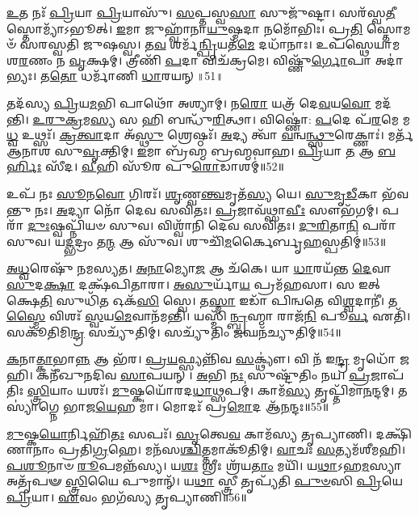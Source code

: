 \-\ul{𑌉}\-𑌤 𑌨𑌃᳴ \ul{𑌪𑍍𑌰𑌿}\-𑌯𑌾 \ul{𑌪𑍍𑌰𑌿}\-𑌯𑌾𑌸𑍁᳴।
\-\ul{𑌸}\-𑌪𑍍𑌤𑌸𑍍𑌵\-\ul{𑌸𑌾} 𑌸𑍁𑌜𑍁᳴𑌷𑍍𑌟𑌾।
𑌸𑌰᳴𑌸𑍍𑌵\-\ul{𑌤𑍀} 𑌸𑍍𑌤𑍋𑌮𑍍𑌯𑌾᳴\-𑌽𑌭𑍂𑌤𑍍।
\-\ul{𑌇}\-𑌮𑌾 𑌜𑍁𑌹𑍍𑌵𑌾᳴𑌨𑌾\-\ul{𑌯𑍁}\-𑌷𑍍𑌮𑌦𑌾 𑌨𑌮𑍋᳴𑌭𑌿𑌃।
𑌪𑍍𑌰\-\ul{𑌤𑌿} 𑌸𑍍𑌤𑍋𑌮𑍞᳴ 𑌸𑌰𑌸𑍍𑌵𑌤𑌿 𑌜𑍁𑌷𑌸𑍍𑌵।
𑌤\-\ul{𑌵} 𑌶𑌰𑍍𑌮᳴\-\ul{𑌨𑍍𑌪𑍍𑌰𑌿}\-𑌯𑌤᳴\-\ul{𑌮𑍇} 𑌦𑌧𑌾᳴𑌨𑌾𑌃।
𑌉𑌪᳴𑌸𑍍𑌥𑍇𑌯𑌾𑌮 𑌶\-\ul{𑌰}\-𑌣𑌂 𑌨 \ul{𑌵𑍃}\-𑌕𑍍𑌷𑌮𑍍।
𑌤𑍍𑌰𑍀𑌣𑌿᳴ \ul{𑌪}\-𑌦𑌾 𑌵𑌿𑌚᳴𑌕𑍍𑌰𑌮𑍇।
𑌵𑌿𑌷𑍍𑌣𑍁᳴\-\ul{𑌰𑍍𑌗𑍋}\-𑌪𑌾 𑌅𑌦𑌾॑𑌭𑍍𑌯𑌃।
𑌤\-\ul{𑌤𑍋} 𑌧𑌰𑍍𑌮𑌾᳴𑌣𑌿 \ul{𑌧𑌾}\-𑌰𑌯𑌨𑍍॥51॥

𑌤𑌦᳴𑌸𑍍𑌯 \ul{𑌪𑍍𑌰𑌿}\-𑌯\-\ul{𑌮}\-𑌭𑌿 𑌪𑌾𑌥𑍋᳴ 𑌅𑌶𑍍𑌯𑌾𑌮𑍍।
𑌨\-\ul{𑌰𑍋} 𑌯𑌤𑍍𑌰᳴ 𑌦𑍇\-\ul{𑌵}\-𑌯\-\ul{𑌵𑍋} 𑌮𑌦᳴𑌨𑍍𑌤𑌿।
\-\ul{𑌉}\-\-\ul{𑌰𑍁}\-\-\ul{𑌕𑍍𑌰}\-𑌮\-\ul{𑌸𑍍𑌯} 𑌸 𑌹𑌿 𑌬𑌨𑍍𑌧𑍁᳴\-\ul{𑌰𑌿}\-𑌤𑍍𑌥𑌾।
𑌵𑌿𑌷𑍍𑌣𑍋॑: \ul{𑌪}\-𑌦𑍇 𑌪᳴\-\ul{𑌰}\-𑌮𑍇 𑌮\-\ul{𑌧𑍍𑌵} 𑌉𑌥𑍍𑌸𑌃᳴।
\-\ul{𑌕𑍍𑌰}\-\-\ul{𑌤𑍍𑌵𑌾}\-𑌦𑌾 𑌅᳴\-\ul{𑌸𑍍𑌥𑍁} 𑌶𑍍𑌰𑍇𑌷𑍍𑌠𑌃᳴।
\-\ul{𑌅}\-𑌦𑍍𑌯 𑌤𑍍𑌵𑌾᳴ \ul{𑌵}\-𑌨𑍍𑌵\-\ul{𑌨𑍍𑌥𑍍𑌸𑍁}\-𑌰𑍇𑌕𑍍𑌣𑌾𑌃॑।
𑌮𑌰𑍍𑌤᳴ 𑌆𑌨𑌾𑌶 𑌸𑍁\-\ul{𑌵𑍃}\-𑌕𑍍𑌤𑌿𑌮𑍍।
\-\ul{𑌇}\-𑌮𑌾 𑌬𑍍𑌰᳴𑌹𑍍𑌮 𑌬𑍍𑌰𑌹𑍍𑌮𑌵𑌾𑌹।
\-\ul{𑌪𑍍𑌰𑌿}\-𑌯𑌾 \ul{𑌤} 𑌆 \ul{𑌬}\-\-\ul{𑌰𑍍}\-𑌹𑌿𑌃 𑌸𑍀᳴𑌦।
\-\ul{𑌵𑍀}\-𑌹𑌿 𑌸𑍂᳴𑌰 𑌪𑍁\-\ul{𑌰𑍋}\-𑌡𑌾𑌶𑌮𑍍॑॥52॥

𑌉𑌪᳴ 𑌨𑌃 \ul{𑌸𑍂}\-𑌨\-\ul{𑌵𑍋} 𑌗𑌿𑌰𑌃᳴।
\-\ul{𑌶𑍃}\-𑌣𑍍𑌵\-\ul{𑌨𑍍𑌤𑍍𑌵}\-𑌮𑍃𑌤᳴\-\ul{𑌸𑍍𑌯} 𑌯𑍇।
\-\ul{𑌸𑍁}\-\-\ul{𑌮𑍃}\-\-\ul{𑌡𑍀}\-𑌕𑌾 𑌭᳴𑌵𑌨𑍍𑌤𑍁 𑌨𑌃।
\-\ul{𑌅}\-𑌦𑍍𑌯𑌾 𑌨𑍋᳴ 𑌦𑍇𑌵 𑌸𑌵𑌿𑌤𑌃।
\-\ul{𑌪𑍍𑌰}\-𑌜𑌾𑌵᳴𑌥𑍍𑌸𑌾\-\ul{𑌵𑍀𑌃} 𑌸𑍗𑌭᳴𑌗𑌮𑍍।
𑌪𑌰𑌾᳴ \ul{𑌦𑍁𑌃}\-𑌷𑍍𑌵𑌪𑍍𑌨𑌿᳴𑌯𑍞 𑌸𑍁𑌵।
𑌵𑌿𑌶𑍍𑌵𑌾᳴𑌨𑌿 𑌦𑍇𑌵 𑌸𑌵𑌿𑌤𑌃।
\-\ul{𑌦𑍁}\-\-\ul{𑌰𑌿}\-𑌤𑌾\-\ul{𑌨𑌿} 𑌪𑌰𑌾᳴ 𑌸𑍁𑌵।
𑌯\-\ul{𑌦𑍍𑌭}\-𑌦𑍍𑌰𑌂 𑌤\-\ul{𑌨𑍍𑌮} 𑌆 𑌸𑍁᳴𑌵।
𑌶𑍁𑌚𑌿᳴\-\ul{𑌮}\-𑌰𑍍𑌕𑍈𑌰𑍍𑌬𑍃\-\ul{𑌹}\-𑌸𑍍𑌪𑌤𑌿𑌮𑍍॑॥53॥

\-\ul{𑌅}\-\-\ul{𑌧𑍍𑌵}\-𑌰𑍇𑌷𑍁᳴ 𑌨𑌮𑌸𑍍𑌯𑌤।
\-\ul{𑌅}\-\-\ul{𑌨𑌾}\-𑌮𑍍𑌯𑍋\-\ul{𑌜} 𑌆 𑌚᳴𑌕𑍇।
𑌯𑌾 \ul{𑌧𑌾}\-𑌰𑌯᳴𑌨𑍍𑌤 \ul{𑌦𑍇}\-𑌵𑌾 \ul{𑌸𑍁}\-𑌦\-\ul{𑌕𑍍𑌷𑌾} 𑌦𑌕𑍍𑌷᳴𑌪𑌿𑌤𑌾𑌰𑌾।
\-\ul{𑌅}\-\-\ul{𑌸𑍁}\-𑌰𑍍𑌯𑌾᳴\-\ul{𑌯} 𑌪𑍍𑌰𑌮᳴𑌹𑌸𑌾।
𑌸 𑌇𑌤𑍍 𑌕𑍍𑌷𑍇\-\ul{𑌤𑌿} 𑌸𑍁𑌧𑌿᳴\-\ul{𑌤} 𑌓𑌕᳴\-\ul{𑌸𑌿} 𑌸𑍍𑌵𑍇।
𑌤\-\ul{𑌸𑍍𑌮𑌾} 𑌇𑌡𑌾᳴ 𑌪𑌿𑌨𑍍𑌵𑌤𑍇 𑌵𑌿\-\ul{𑌶𑍍𑌵}\-𑌦𑌾𑌨𑍀॑।
𑌤\-\ul{𑌸𑍍𑌮𑍈} 𑌵𑌿𑌶𑌃᳴ \ul{𑌸𑍍𑌵}\-𑌯\-\ul{𑌮𑍇}\-𑌵𑌾𑌨᳴𑌮𑌨𑍍𑌤𑌿।
𑌯𑌸𑍍𑌮𑌿᳴\-\ul{𑌨𑍍𑌬𑍍𑌰}\-𑌹𑍍𑌮𑌾 𑌰𑌾𑌜᳴\-\ul{𑌨𑌿} 𑌪𑍂\-\ul{𑌰𑍍𑌵} 𑌏𑌤𑌿᳴।
𑌸𑌕𑍂᳴𑌤𑌿𑌮𑌿\-\ul{𑌨𑍍𑌦𑍍𑌰} 𑌸𑌚𑍍𑌯𑍁᳴𑌤𑌿𑌮𑍍।
𑌸𑌚𑍍𑌯𑍁᳴𑌤𑌿𑌂 \ul{𑌜}\-𑌘𑌨᳴𑌚𑍍𑌯𑍁𑌤𑌿𑌮𑍍॥54॥

\-\ul{𑌕}\-𑌨𑌾\-\ul{𑌤𑍍𑌕𑌾}\-𑌭𑌾\-\ul{𑌨𑍍𑌨} 𑌆 𑌭᳴𑌰।
\-\ul{𑌪𑍍𑌰}\-\-\ul{𑌯}\-𑌫𑍍𑌸𑍍𑌯𑌨𑍍𑌨𑌿᳴𑌵 \ul{𑌸}\-𑌕𑍍𑌥𑍍𑌯𑍗॑।
𑌵𑌿 𑌨᳴ 𑌇\-\ul{𑌨𑍍𑌦𑍍𑌰} 𑌮𑍃𑌧𑍋᳴ 𑌜𑌹𑌿।
𑌕𑌨𑍀᳴𑌖𑍁𑌨𑌦𑌿𑌵 \ul{𑌸𑌾}\-𑌪𑌯𑌨𑍍।
\-\ul{𑌅}\-𑌭𑌿 \ul{𑌨𑌃} 𑌸𑍁𑌷𑍍𑌟𑍁᳴𑌤𑌿𑌂 𑌨𑌯।
\-\ul{𑌪𑍍𑌰}\-𑌜𑌾\-𑌪᳴𑌤𑌿𑌃 \ul{𑌸𑍍𑌤𑍍𑌰𑌿}\-𑌯𑌾𑌂 𑌯𑌶𑌃᳴।
\-\ul{𑌮𑍁}\-𑌷𑍍𑌕𑌯𑍋᳴𑌰𑌦\-\ul{𑌧𑌾}\-𑌥𑍍𑌸𑌪𑌮𑍍॑।
𑌕𑌾𑌮᳴\-\ul{𑌸𑍍𑌯} 𑌤𑍃𑌪𑍍𑌤𑌿᳴𑌮𑌾\-\ul{𑌨}\-𑌨𑍍𑌦𑌮𑍍।
𑌤𑌸𑍍𑌯𑌾॑𑌗𑍍𑌨𑍇 𑌭𑌾𑌜\-\ul{𑌯𑍇}\-𑌹 𑌮𑌾॑।
𑌮𑍋𑌦𑌃᳴ 𑌪𑍍𑌰\-\ul{𑌮𑍋}\-𑌦 𑌆᳴\-\ul{𑌨}\-𑌨𑍍𑌦𑌃॥55॥

\-\ul{𑌮𑍁}\-𑌷𑍍𑌕\-\ul{𑌯𑍋}\-𑌰𑍍𑌨𑌿𑌹𑌿᳴\-\ul{𑌤𑌃} 𑌸𑌪𑌃᳴।
\-\ul{𑌸𑍃}\-𑌤𑍍𑌵𑍇\-\ul{𑌵} 𑌕𑌾𑌮᳴𑌸𑍍𑌯 𑌤𑍃𑌪𑍍𑌯𑌾𑌣𑌿।
𑌦𑌕𑍍𑌷𑌿᳴𑌣𑌾𑌨𑌾𑌂 𑌪𑍍𑌰𑌤𑌿\-\ul{𑌗𑍍𑌰}\-𑌹𑍇।
𑌮𑌨᳴𑌸\-\ul{𑌶𑍍𑌚𑌿}\-𑌤𑍍𑌤𑌮𑌾𑌕𑍂᳴𑌤𑌿𑌮𑍍।
\-\ul{𑌵𑌾}\-𑌚𑌃 \ul{𑌸}\-𑌤𑍍𑌯𑌮᳴𑌶𑍀𑌮𑌹𑌿।
\-\ul{𑌪}\-\-\ul{𑌶𑍂}\-𑌨𑌾𑍞 \ul{𑌰𑍂}\-𑌪𑌮𑌨𑍍𑌨᳴𑌸𑍍𑌯।
𑌯\-\ul{𑌶𑌃} 𑌶𑍍𑌰𑍀𑌃 𑌶𑍍𑌰᳴𑌯\-\ul{𑌤𑌾𑌂} 𑌮𑌯𑌿᳴।
𑌯\-\ul{𑌥𑌾}\-𑌽𑌹\-\ul{𑌮}\-𑌸𑍍𑌯𑌾 𑌅𑌤𑍃᳴𑌪𑍟 \ul{𑌸𑍍𑌤𑍍𑌰𑌿}\-𑌯𑍈 𑌪𑍁𑌮𑌾𑌨𑍍᳴।
𑌯\-\ul{𑌥𑌾} 𑌸𑍍𑌤𑍍𑌰𑍀 𑌤𑍃𑌪𑍍𑌯᳴𑌤𑌿 \ul{𑌪𑍁}\-\-\ul{𑍞}\-𑌸𑌿 \ul{𑌪𑍍𑌰𑌿}\-𑌯𑍇 \ul{𑌪𑍍𑌰𑌿}\-𑌯𑌾।
\-\ul{𑌏}\-𑌵𑌂 𑌭𑌗᳴𑌸𑍍𑌯 𑌤𑍃𑌪𑍍𑌯𑌾𑌣𑌿॥56॥

